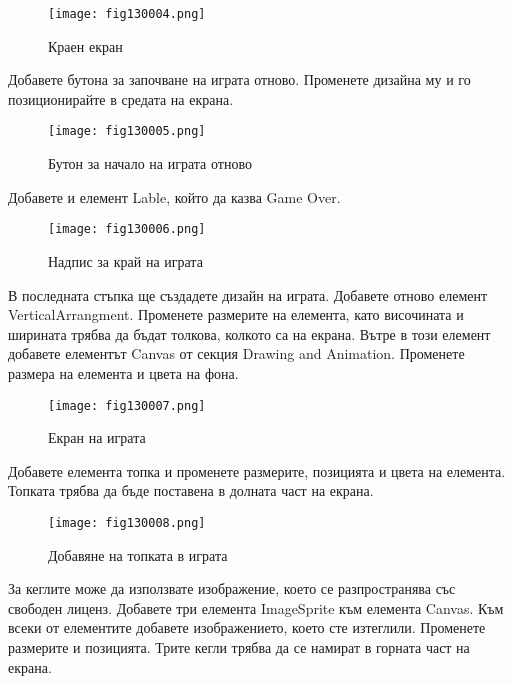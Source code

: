 \begin{figure}[H]
  \centering
  \texttt{[image: fig130004.png]}
  \caption{Краен екран}
\label{fig130004}
\end{figure}

Добавете бутона за започване на играта отново. Променете дизайна му и го позиционирайте в средата на екрана.

\begin{figure}[H]
  \centering
  \texttt{[image: fig130005.png]}
  \caption{Бутон за начало на играта отново}
\label{fig130005}
\end{figure}

Добавете и елемент Lable, който да казва Game Over.

\begin{figure}[H]
  \centering
  \texttt{[image: fig130006.png]}
  \caption{Надпис за край на играта}
\label{fig130006}
\end{figure}

В последната стъпка ще създадете дизайн на играта. Добавете отново елемент VerticalArrangment. Променете размерите на елемента, като височината и ширината трябва да бъдат толкова, колкото са на екрана. Вътре в този елемент добавете елементът Canvas от секция Drawing and Animation. Променете размера на елемента и цвета на фона.

\begin{figure}[H]
  \centering
  \texttt{[image: fig130007.png]}
  \caption{Екран на играта}
\label{fig130007}
\end{figure}

Добавете елемента топка и променете размерите, позицията и цвета на елемента. Топката трябва да бъде поставена в долната част на екрана.

\begin{figure}[H]
  \centering
  \texttt{[image: fig130008.png]}
  \caption{Добавяне на топката в играта}
\label{fig130008}
\end{figure}

За кеглите може да използвате изображение, което се разпространява със свободен лиценз. Добавете три елемента ImageSprite към елемента Canvas. Към всеки от елементите добавете изображението, което сте изтеглили. Променете размерите и позицията. Трите кегли трябва да се намират в горната част на екрана.

